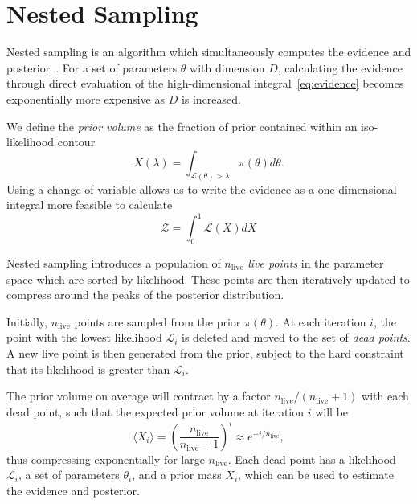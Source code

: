 \documentclass[11pt]{article}
\begin{document}
    \section{Nested Sampling}\label{sec:nested_sampling}
    Nested sampling is an algorithm which simultaneously computes
    the evidence and posterior~\cite{Skilling2006, Handley_polychord, NS_Review_2022}.
    For a set of parameters $\theta$ with dimension $D$, calculating the evidence through direct evaluation of the
    high-dimensional integral~\eqref{eq:evidence} becomes exponentially more expensive as $D$ is increased.

    We define the \emph{prior volume} as the fraction of prior contained within an iso-likelihood contour
    \begin{equation}\label{eq:prior_volume}
    X(\lambda) = \int_{\mathcal{L}(\theta)>\lambda} \pi(\theta) d\theta.
    \end{equation}
    Using a change of variable allows us to write the evidence as a one-dimensional integral more feasible to calculate
    \begin{equation}\label{eq:evidence_ns}
    \mathcal{Z} = \int_0^1 {\mathcal{L}(X)} dX
    \end{equation}

    Nested sampling introduces a population of $n_{\text{live}}$ \emph{live points} in the parameter space which are sorted
    by likelihood.
    These points are then iteratively updated to compress around the peaks of the posterior distribution.

    Initially, $n_{\text{live}}$ points are sampled from the prior $\pi(\theta)$.
    At each iteration $i$, the point with the lowest likelihood $\mathcal{L}_i$ is deleted and moved to the set
    of \emph{dead points}.
    A new live point is then generated from the prior, subject to the hard constraint that its likelihood is
    greater than $\mathcal{L}_i$.

    The prior volume on average will contract by a factor $n_{\text{live}}/(n_{\text{live}}+1)$ with each dead point, such that the
    expected prior volume at iteration $i$ will be
    \begin{equation}\label{eq:exp_prior_volume}
    \langle X_i \rangle = \left( \frac{n_{\text{live}}}{n_{\text{live}} + 1} \right)^i \approx e^{-i/n_{\text{live}}},
    \end{equation}
    thus compressing exponentially for large $n_{\text{live}}$.
    Each dead point has a likelihood $\mathcal{L}_i$, a set of parameters $\theta_i$, and a prior mass $X_i$, which can
    be used to estimate the evidence and posterior.
\end{document}
